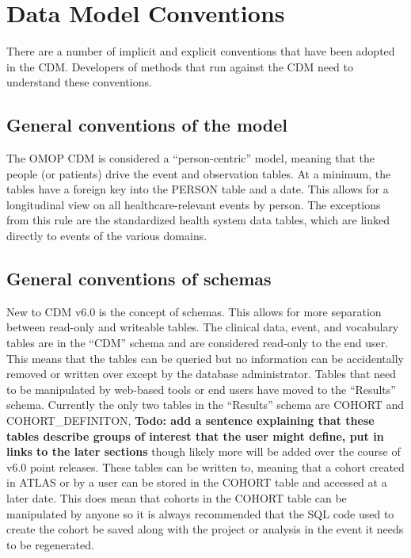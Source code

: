 \documentclass[11pt]{book}
\theoremstyle{definition}
\theoremstyle{definition}
\theoremstyle{definition}
\theoremstyle{remark}
\begin{document}
\hypertarget{data-model-conventions}{%
\section{Data Model Conventions}\label{data-model-conventions}}

There are a number of implicit and explicit conventions that have been adopted in the CDM. Developers of methods that run against the CDM need to understand these conventions.

\hypertarget{model-conv}{%
\subsection{General conventions of the model}\label{model-conv}}

The OMOP CDM is considered a ``person-centric'' model, meaning that the people (or patients) drive the event and observation tables. At a minimum, the tables have a foreign key into the PERSON table and a date. This allows for a longitudinal view on all healthcare-relevant events by person. The exceptions from this rule are the standardized health system data tables, which are linked directly to events of the various domains.

\hypertarget{general-conventions-of-schemas}{%
\subsection{General conventions of schemas}\label{general-conventions-of-schemas}}

New to CDM v6.0 is the concept of schemas. This allows for more separation between read-only and writeable tables. The clinical data, event, and vocabulary tables are in the ``CDM'' schema and are considered read-only to the end user. This means that the tables can be queried but no information can be accidentally removed or written over except by the database administrator. Tables that need to be manipulated by web-based tools or end users have moved to the ``Results'' schema. Currently the only two tables in the ``Results'' schema are COHORT and COHORT\_DEFINITON, \textbf{Todo: add a sentence explaining that these tables describe groups of interest that the user might define, put in links to the later sections} though likely more will be added over the course of v6.0 point releases. These tables can be written to, meaning that a cohort created in ATLAS or by a user can be stored in the COHORT table and accessed at a later date. This does mean that cohorts in the COHORT table can be manipulated by anyone so it is always recommended that the SQL code used to create the cohort be saved along with the project or analysis in the event it needs to be regenerated.
\end{document}
